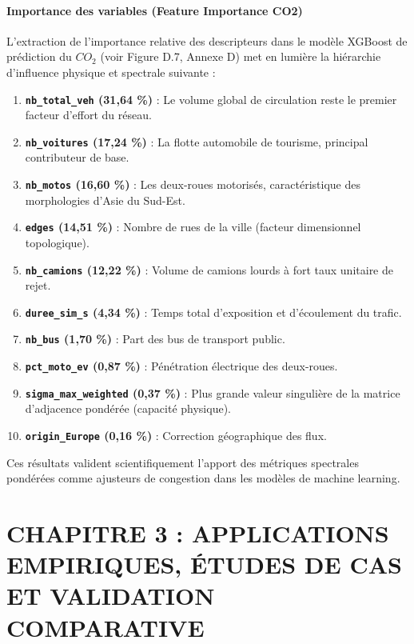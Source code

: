 \documentclass[10pt, a4paper]{article}
\providecommand{\tightlist}{}
\begin{document}
\newpage

\paragraph{Importance des variables (Feature Importance
CO2)}\label{importance-des-variables-feature-importance-co2}

L'extraction de l'importance relative des descripteurs dans le modèle
XGBoost de prédiction du \(CO_2\) (voir Figure D.7, Annexe D) met en
lumière la hiérarchie d'influence physique et spectrale suivante :

\begin{enumerate}
\def\labelenumi{\arabic{enumi}.}
\tightlist
\item
  \textbf{\texttt{nb\_total\_veh} (31,64 \%)} : Le volume global de
  circulation reste le premier facteur d'effort du réseau.
\item
  \textbf{\texttt{nb\_voitures} (17,24 \%)} : La flotte automobile de
  tourisme, principal contributeur de base.
\item
  \textbf{\texttt{nb\_motos} (16,60 \%)} : Les deux-roues motorisés,
  caractéristique des morphologies d'Asie du Sud-Est.
\item
  \textbf{\texttt{edges} (14,51 \%)} : Nombre de rues de la ville
  (facteur dimensionnel topologique).
\item
  \textbf{\texttt{nb\_camions} (12,22 \%)} : Volume de camions lourds à
  fort taux unitaire de rejet.
\item
  \textbf{\texttt{duree\_sim\_s} (4,34 \%)} : Temps total d'exposition
  et d'écoulement du trafic.
\item
  \textbf{\texttt{nb\_bus} (1,70 \%)} : Part des bus de transport
  public.
\item
  \textbf{\texttt{pct\_moto\_ev} (0,87 \%)} : Pénétration électrique des
  deux-roues.
\item
  \textbf{\texttt{sigma\_max\_weighted} (0,37 \%)} : Plus grande valeur
  singulière de la matrice d'adjacence pondérée (capacité physique).
\item
  \textbf{\texttt{origin\_Europe} (0,16 \%)} : Correction géographique
  des flux.
\end{enumerate}

Ces résultats valident scientifiquement l'apport des métriques
spectrales pondérées comme ajusteurs de congestion dans les modèles de
machine learning.

\newpage

\section{CHAPITRE 3 : APPLICATIONS EMPIRIQUES, ÉTUDES DE CAS ET
VALIDATION
COMPARATIVE}\label{chapitre-3-applications-empiriques-uxe9tudes-de-cas-et-validation-comparative}
\end{document}
